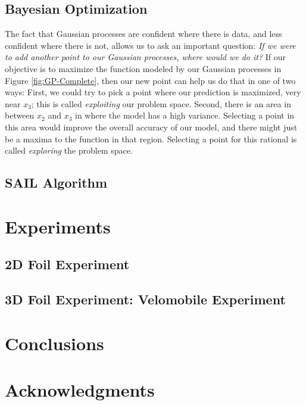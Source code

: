 \documentclass{sig-alternate}
\begin{document}
\subsection{Bayesian Optimization}
\label{bayesianOptimization}

The fact that Gaussian processes are confident where there is data, and less confident where there is not, allows us to ask an important question:
\textit{If we were to add another point to our Gaussian processes, where would we do it?}
If our objective is to maximize the function modeled by our Gaussian processes in Figure \ref{fig:GP-Complete}, then our new point can help us do that in one of two ways:
First, we could try to pick a point where our prediction is maximized, very near $x_3$; this is called \textit{exploiting} our problem space.
Second, there is an area in between $x_2$ and $x_3$ in where the model has a high variance.
Selecting a point in this area would improve the overall accuracy of our model, and there might just be a maxima to the function in that region.
Selecting a point for this rational is called \textit{exploring} the problem space.

\subsection{SAIL Algorithm}
\label{SAILAlgorithm}

\section{Experiments}
\label{experiments}

\subsection{2D Foil Experiment}
\label{2DFoilExperiment}

\subsection{3D Foil Experiment: Velomobile Experiment}
\label{3DFoilExperiment}

\section{Conclusions}
\label{sec:conclusions}

\section*{Acknowledgments}
\label{sec:acknowledgments}


  
\end{document}
